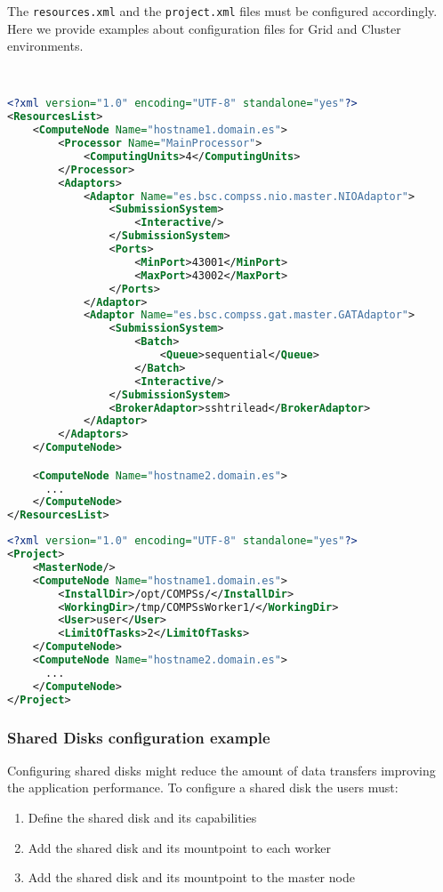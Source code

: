 The \texttt{resources.xml} and the \texttt{project.xml} files must be configured accordingly.
Here we provide examples about configuration files for Grid and Cluster environments.

~ \newline

\begin{lstlisting}[language=xml]
<?xml version="1.0" encoding="UTF-8" standalone="yes"?>
<ResourcesList>
    <ComputeNode Name="hostname1.domain.es">
        <Processor Name="MainProcessor">
            <ComputingUnits>4</ComputingUnits>
        </Processor>
        <Adaptors>
            <Adaptor Name="es.bsc.compss.nio.master.NIOAdaptor">
                <SubmissionSystem>
                    <Interactive/>
                </SubmissionSystem>
                <Ports>
                    <MinPort>43001</MinPort>
                    <MaxPort>43002</MaxPort>
                </Ports>
            </Adaptor>
            <Adaptor Name="es.bsc.compss.gat.master.GATAdaptor">
                <SubmissionSystem>
                    <Batch>
                        <Queue>sequential</Queue>
                    </Batch>
                    <Interactive/>
                </SubmissionSystem>
                <BrokerAdaptor>sshtrilead</BrokerAdaptor>
            </Adaptor>
        </Adaptors>
    </ComputeNode>

    <ComputeNode Name="hostname2.domain.es">
      ...
    </ComputeNode>
</ResourcesList>
\end{lstlisting}

\newpage

\begin{lstlisting}[language=xml]
<?xml version="1.0" encoding="UTF-8" standalone="yes"?>
<Project>
    <MasterNode/>
    <ComputeNode Name="hostname1.domain.es">
        <InstallDir>/opt/COMPSs/</InstallDir>
        <WorkingDir>/tmp/COMPSsWorker1/</WorkingDir>
        <User>user</User>
        <LimitOfTasks>2</LimitOfTasks>
    </ComputeNode>
    <ComputeNode Name="hostname2.domain.es">
      ...
    </ComputeNode>
</Project>
\end{lstlisting}


\subsubsection{Shared Disks configuration example}
Configuring shared disks might reduce the amount of data transfers improving the application performance. To configure a
shared disk the users must:
\begin{enumerate}
 \item Define the shared disk and its capabilities
 \item Add the shared disk and its mountpoint to each worker
 \item Add the shared disk and its mountpoint to the master node
\end{enumerate}

